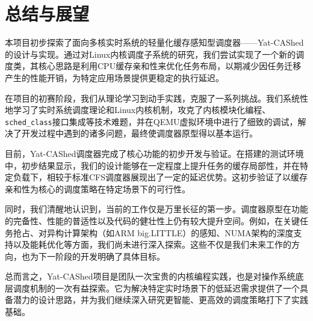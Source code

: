 
\section{总结与展望} \label{sec:conclusion}

本项目初步探索了面向多核实时系统的轻量化缓存感知型调度器——Yat-CAShed的设计与实现。通过对Linux内核调度子系统的研究，我们尝试实现了一个新的调度类，其核心思路是利用CPU缓存亲和性来优化任务布局，以期减少因任务迁移产生的性能开销，为特定应用场景提供更稳定的执行延迟。

在项目的初赛阶段，我们从理论学习到动手实践，克服了一系列挑战。我们系统性地学习了实时系统调度理论和Linux内核机制，攻克了内核模块化编程、\texttt{sched\_class}接口集成等技术难题，并在QEMU虚拟环境中进行了细致的调试，解决了开发过程中遇到的诸多问题，最终使调度器原型得以基本运行。

目前，Yat-CAShed调度器完成了核心功能的初步开发与验证。在搭建的测试环境中，初步结果显示，我们的设计能够在一定程度上提升任务的缓存局部性，并在特定负载下，相较于标准CFS调度器展现出了一定的延迟优势。这初步验证了以缓存亲和性为核心的调度策略在特定场景下的可行性。

同时，我们清醒地认识到，当前的工作仅是万里长征的第一步。调度器原型在功能的完备性、性能的普适性以及代码的健壮性上仍有较大提升空间。例如，在关键任务抢占、对异构计算架构（如ARM big.LITTLE）的感知、NUMA架构的深度支持以及能耗优化等方面，我们尚未进行深入探索。这些不仅是我们未来工作的方向，也为下一阶段的开发明确了具体目标。

总而言之，Yat-CAShed项目是团队一次宝贵的内核编程实践，也是对操作系统底层调度机制的一次有益探索。它为解决特定实时场景下的低延迟需求提供了一个具备潜力的设计思路，并为我们继续深入研究更智能、更高效的调度策略打下了实践基础。
